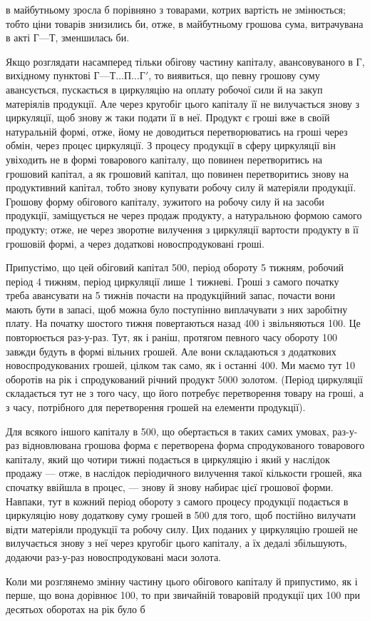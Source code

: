 \parcont{}  %
в майбутньому зросла б порівняно з товарами, котрих вартість не змінюється;
тобто ціни товарів знизились би, отже, в майбутньому грошова
сума, витрачувана в акті $Г — Т$, зменшилась би.

Якщо розглядати насамперед тільки обігову частину капіталу, авансовуваного
в Г, вихідному пунктові $Г — Т\dots{} П\dots{} Г'$, то виявиться, що певну
грошову суму авансується, пускається в циркуляцію на оплату робочої
сили й на закуп матеріялів продукції. Але через кругобіг цього капіталу
її не вилучається знову з циркуляції, щоб знову ж таки подати її
в неї. Продукт є гроші вже в своїй натуральній формі, отже, йому не
доводиться перетворюватись на гроші через обмін, через процес
циркуляції. З процесу продукції в сферу циркуляції він увіходить не в
формі товарового капіталу, що повинен перетворитись на грошовий капітал,
а як грошовий капітал, що повинен перетворитись знову на продуктивний
капітал, тобто знову купувати робочу силу й матеріяли продукції.
Грошову форму обігового капіталу, зужитого на робочу силу й на засоби
продукції, заміщується не через продаж продукту, а натуральною
формою самого продукту; отже, не через зворотне вилучення з циркуляції
вартости продукту в її грошовій формі, а через додаткові новоспродуковані
гроші.

Припустімо, що цей обіговий капітал \deq{} 500, період обороту
\deq{} 5 тижням, робочий період \deq{} 4 тижням, період циркуляції \deq{} лише 1
тижневі. Гроші з самого початку треба авансувати на 5 тижнів почасти
на продукційний запас, почасти вони мають бути в запасі, щоб можна
було поступінно виплачувати з них заробітну плату. На початку шостого
тижня повертаються назад 400 і звільняються 100. Це
повторюється раз-у-раз. Тут, як і раніш, протягом певного часу обороту
100 завжди будуть в формі вільних грошей. Але вони складаються
з додаткових новоспродукованих грошей, цілком так само, як і останні
400. Ми маємо тут 10 оборотів на рік і спродукований річний
продукт \deq{} 5000 золотом. (Період циркуляції складається тут
не з того часу, що його потребує перетворення товару на гроші, а з
часу, потрібного для перетворення грошей на елементи продукції).

Для всякого іншого капіталу в 500, що обертається в таких
самих умовах, раз-у-раз відновлювана грошова форма є перетворена форма
спродукованого товарового капіталу, який що чотири тижні подається
в циркуляцію і який у наслідок продажу — отже, в наслідок періодичного
вилучення такої кількости грошей, яка спочатку ввійшла в процес, —
знову й знову набирає цієї грошової форми. Навпаки, тут в кожний період
обороту з самого процесу продукції подається в циркуляцію нову
додаткову суму грошей в 500 для того, щоб постійно вилучати
відти матеріяли продукції та робочу силу. Цих поданих у циркуляцію
грошей не вилучається знову з неї через кругобіг цього капіталу, а їх
дедалі збільшують, додаючи раз-у-раз новоспродуковані маси золота.

Коли ми розглянемо змінну частину цього обігового капіталу й припустимо,
як і перше, що вона дорівнює 100, то при звичайній
товаровій продукції цих 100 при десятьох оборотах на рік було б
\parbreak{}  %

